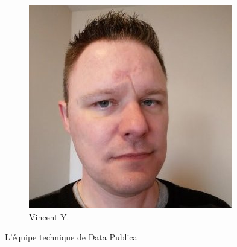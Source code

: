 \begin{figure}[h!]
\begin{subfigure}[b]{0.2\textwidth}
                \includegraphics[width=\textwidth]{images/vincent.jpg}
                \caption{Vincent Y.}
            \end{subfigure}
            \caption{L'équipe technique de Data Publica}
            \label{fig:teamd_data_publica}
        \end{figure}

\newpage

